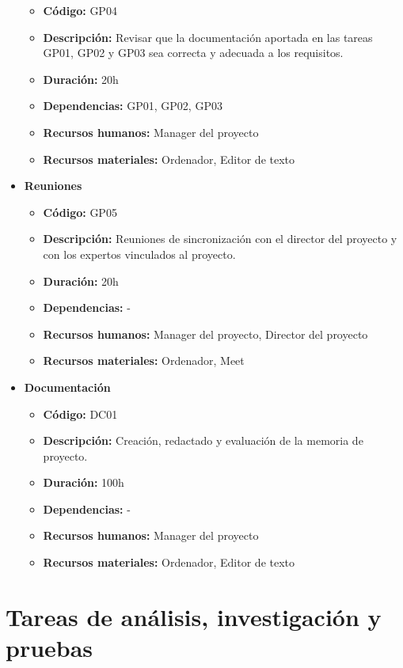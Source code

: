 \begin{itemize}
        \begin{itemize}
            \item \textbf{Código:} GP04
            \item \textbf{Descripción:} Revisar que la documentación aportada en las tareas GP01, GP02 y GP03 sea correcta y adecuada a los requisitos.
            \item \textbf{Duración:} 20h
            \item \textbf{Dependencias:} GP01, GP02, GP03
            \item \textbf{Recursos humanos:} Manager del proyecto
            \item \textbf{Recursos materiales:} Ordenador, Editor de texto
        \end{itemize}
    \item \textbf{Reuniones}
        \begin{itemize}
            \item \textbf{Código:} GP05
            \item \textbf{Descripción:} Reuniones de sincronización con el director del proyecto y con los expertos vinculados al proyecto.
            \item \textbf{Duración:} 20h
            \item \textbf{Dependencias:} - 
            \item \textbf{Recursos humanos:} Manager del proyecto, Director del proyecto
            \item \textbf{Recursos materiales:} Ordenador, Meet
        \end{itemize}
    \item \textbf{Documentación}
        \begin{itemize}
            \item \textbf{Código:} DC01
            \item \textbf{Descripción:} Creación, redactado y evaluación de la memoria de proyecto.
            \item \textbf{Duración:} 100h
            \item \textbf{Dependencias:} -
            \item \textbf{Recursos humanos:} Manager del proyecto
            \item \textbf{Recursos materiales:} Ordenador, Editor de texto
        \end{itemize}
\end{itemize}

\section{Tareas de análisis, investigación y pruebas}
\label{sec:tareas_analisis}

